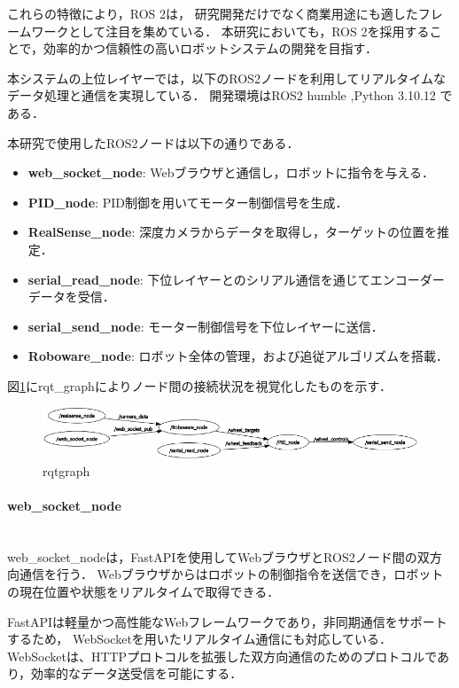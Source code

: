 これらの特徴により，ROS 2は，
研究開発だけでなく商業用途にも適したフレームワークとして注目を集めている．
本研究においても，ROS 2を採用することで，効率的かつ信頼性の高いロボットシステムの開発を目指す．

本システムの上位レイヤーでは，以下のROS2ノードを利用してリアルタイムなデータ処理と通信を実現している．
開発環境はROS2 humble ,Python 3.10.12 である．

本研究で使用したROS2ノードは以下の通りである．
\begin{itemize}
    \item \textbf{web\_socket\_node}: Webブラウザと通信し，ロボットに指令を与える．
    \item \textbf{PID\_node}: PID制御を用いてモーター制御信号を生成．
    \item \textbf{RealSense\_node}: 深度カメラからデータを取得し，ターゲットの位置を推定．
    \item \textbf{serial\_read\_node}: 下位レイヤーとのシリアル通信を通じてエンコーダーデータを受信．
    \item \textbf{serial\_send\_node}: モーター制御信号を下位レイヤーに送信．
    \item \textbf{Roboware\_node}: ロボット全体の管理，および追従アルゴリズムを搭載．
\end{itemize}

図\ref{fig:rqt}にrqt\_graphによりノード間の接続状況を視覚化したものを示す．

\begin{figure}[H]
    \centering
    \includegraphics[width=1.0\textwidth]{figure/rqtgraph_v1.4.pdf}
    \caption{rqtgraph}
    \label{fig:rqt}
\end{figure}
\newpage

\paragraph{web\_socket\_node}\mbox{}\\
web\_socket\_nodeは，FastAPIを使用してWebブラウザとROS2ノード間の双方向通信を行う．
Webブラウザからはロボットの制御指令を送信でき，ロボットの現在位置や状態をリアルタイムで取得できる．

FastAPIは軽量かつ高性能なWebフレームワークであり，非同期通信をサポートするため，
WebSocketを用いたリアルタイム通信にも対応している．
WebSocketは、HTTPプロトコルを拡張した双方向通信のためのプロトコルであり，効率的なデータ送受信を可能にする．

